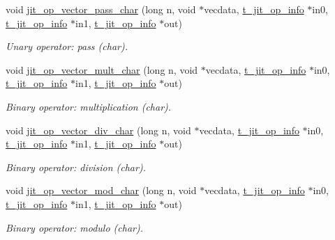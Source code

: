 \begin{DoxyCompactItemize}
\item 
void \hyperlink{group__opvecmod_ga40972e92305f4e7a0355b12a858d25d1}{jit\_\-op\_\-vector\_\-pass\_\-char} (long n, void $\ast$vecdata, \hyperlink{structt__jit__op__info}{t\_\-jit\_\-op\_\-info} $\ast$in0, \hyperlink{structt__jit__op__info}{t\_\-jit\_\-op\_\-info} $\ast$in1, \hyperlink{structt__jit__op__info}{t\_\-jit\_\-op\_\-info} $\ast$out)
\begin{DoxyCompactList}\small\item\em Unary operator: pass (char). \item\end{DoxyCompactList}\item 
void \hyperlink{group__opvecmod_ga31a5c6806af3992c08dbc58650cd9e6f}{jit\_\-op\_\-vector\_\-mult\_\-char} (long n, void $\ast$vecdata, \hyperlink{structt__jit__op__info}{t\_\-jit\_\-op\_\-info} $\ast$in0, \hyperlink{structt__jit__op__info}{t\_\-jit\_\-op\_\-info} $\ast$in1, \hyperlink{structt__jit__op__info}{t\_\-jit\_\-op\_\-info} $\ast$out)
\begin{DoxyCompactList}\small\item\em Binary operator: multiplication (char). \item\end{DoxyCompactList}\item 
void \hyperlink{group__opvecmod_ga5a286b075af860bac30e6e223cc900b8}{jit\_\-op\_\-vector\_\-div\_\-char} (long n, void $\ast$vecdata, \hyperlink{structt__jit__op__info}{t\_\-jit\_\-op\_\-info} $\ast$in0, \hyperlink{structt__jit__op__info}{t\_\-jit\_\-op\_\-info} $\ast$in1, \hyperlink{structt__jit__op__info}{t\_\-jit\_\-op\_\-info} $\ast$out)
\begin{DoxyCompactList}\small\item\em Binary operator: division (char). \item\end{DoxyCompactList}\item 
void \hyperlink{group__opvecmod_gad07318c7b4b42c9ea83e4d08abac3f57}{jit\_\-op\_\-vector\_\-mod\_\-char} (long n, void $\ast$vecdata, \hyperlink{structt__jit__op__info}{t\_\-jit\_\-op\_\-info} $\ast$in0, \hyperlink{structt__jit__op__info}{t\_\-jit\_\-op\_\-info} $\ast$in1, \hyperlink{structt__jit__op__info}{t\_\-jit\_\-op\_\-info} $\ast$out)
\begin{DoxyCompactList}\small\item\em Binary operator: modulo (char). \item\end{DoxyCompactList}\item 

\end{DoxyCompactItemize}
